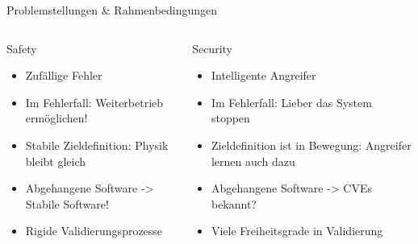 \begin{frame}[T]{Problemstellungen \& Rahmenbedingungen}
\small
  \begin{columns}[t,fullwidth]
   \hfill
    \begin{column}{.45\linewidth}
      \begin{block}{Safety}
      \begin{itemize}
        \item Zufällige Fehler
        \item Im Fehlerfall: Weiterbetrieb ermöglichen!
        \item Stabile Zieldefinition: Physik bleibt gleich
        \item Abgehangene Software -> Stabile Software!
        \item Rigide Validierungsprozesse
      \end{itemize}
      \end{block}
    \end{column}
    \hfill
    \begin{column}{.45\linewidth}
      \begin{block}{Security}
      \begin{itemize}
        \item Intelligente Angreifer
        \item Im Fehlerfall: Lieber das System stoppen
        \item Zieldefinition ist in Bewegung: Angreifer lernen auch dazu
        \item Abgehangene Software -> CVEs bekannt?
        \item Viele Freiheitsgrade in Validierung
      \end{itemize}
      \end{block}
    \end{column}
    \hfill
  \end{columns}
\end{frame}

